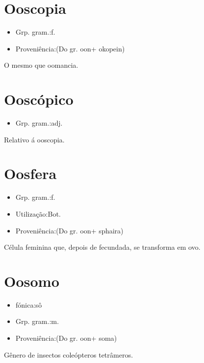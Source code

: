 \section{Ooscopia}
\begin{itemize}
\item {Grp. gram.:f.}
\end{itemize}
\begin{itemize}
\item {Proveniência:(Do gr. \textunderscore oon\textunderscore  + \textunderscore okopein\textunderscore )}
\end{itemize}
O mesmo que \textunderscore oomancia\textunderscore .
\section{Ooscópico}
\begin{itemize}
\item {Grp. gram.:adj.}
\end{itemize}
Relativo á ooscopia.
\section{Oosfera}
\begin{itemize}
\item {Grp. gram.:f.}
\end{itemize}
\begin{itemize}
\item {Utilização:Bot.}
\end{itemize}
\begin{itemize}
\item {Proveniência:(Do gr. \textunderscore oon\textunderscore  + \textunderscore sphaira\textunderscore )}
\end{itemize}
Célula feminina que, depois de fecundada, se transforma em ovo.
\section{Oosomo}
\begin{itemize}
\item {fónica:sô}
\end{itemize}
\begin{itemize}
\item {Grp. gram.:m.}
\end{itemize}
\begin{itemize}
\item {Proveniência:(Do gr. \textunderscore oon\textunderscore  + \textunderscore soma\textunderscore )}
\end{itemize}
Gênero de insectos coleópteros tetrâmeros.
